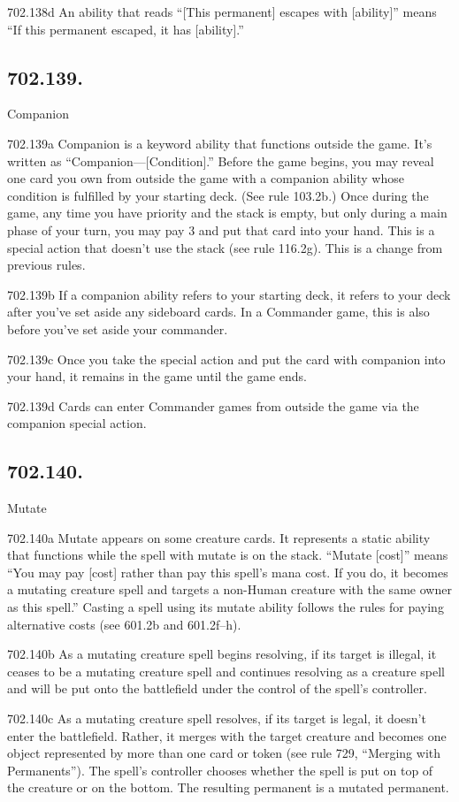 702.138d An ability that reads “[This permanent] escapes with [ability]” means “If this permanent escaped, it has [ability].”

\subsection*{702.139.}
Companion

702.139a Companion is a keyword ability that functions outside the game. It’s written as “Companion—[Condition].” Before the game begins, you may reveal one card you own from outside the game with a companion ability whose condition is fulfilled by your starting deck. (See rule 103.2b.) Once during the game, any time you have priority and the stack is empty, but only during a main phase of your turn, you may pay {3} and put that card into your hand. This is a special action that doesn’t use the stack (see rule 116.2g). This is a change from previous rules.

702.139b If a companion ability refers to your starting deck, it refers to your deck after you’ve set aside any sideboard cards. In a Commander game, this is also before you’ve set aside your commander.

702.139c Once you take the special action and put the card with companion into your hand, it remains in the game until the game ends.

702.139d Cards can enter Commander games from outside the game via the companion special action.

\subsection*{702.140.}
Mutate

702.140a Mutate appears on some creature cards. It represents a static ability that functions while the spell with mutate is on the stack. “Mutate [cost]” means “You may pay [cost] rather than pay this spell’s mana cost. If you do, it becomes a mutating creature spell and targets a non-Human creature with the same owner as this spell.” Casting a spell using its mutate ability follows the rules for paying alternative costs (see 601.2b and 601.2f–h).

702.140b As a mutating creature spell begins resolving, if its target is illegal, it ceases to be a mutating creature spell and continues resolving as a creature spell and will be put onto the battlefield under the control of the spell’s controller.

702.140c As a mutating creature spell resolves, if its target is legal, it doesn’t enter the battlefield. Rather, it merges with the target creature and becomes one object represented by more than one card or token (see rule 729, “Merging with Permanents”). The spell’s controller chooses whether the spell is put on top of the creature or on the bottom. The resulting permanent is a mutated permanent.

